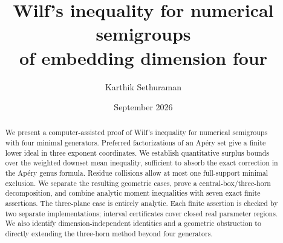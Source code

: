 \documentclass[11pt]{article}
\title{Wilf's inequality for numerical semigroups\\of embedding dimension four}
\author{Karthik Sethuraman}
\date{September 2026}
\numberwithin{equation}{section}
\theoremstyle{definition}
\theoremstyle{remark}
\begin{document}
\maketitle
\begin{abstract}
We present a computer-assisted proof of Wilf's inequality for numerical
semigroups with four minimal generators. Preferred factorizations of an
Ap\'ery set give a finite lower ideal in three exponent coordinates. We
establish quantitative surplus bounds over the weighted downset mean
inequality, sufficient to absorb the exact correction in the Ap\'ery genus
formula.
Residue collisions allow at most one full-support minimal exclusion.
We separate the resulting geometric cases, prove a central-box/three-horn
decomposition, and combine analytic moment inequalities with seven exact
finite assertions. The three-plane case is entirely analytic. Each
finite assertion is checked by two separate implementations; interval
certificates cover closed real parameter regions.
We also identify dimension-independent identities and a geometric obstruction
to directly extending the three-horn method beyond four generators.
\end{abstract}


\tableofcontents








\end{document}
